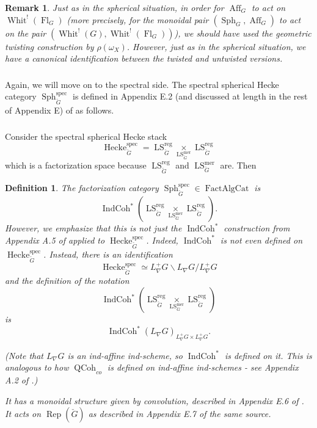 \documentclass[10pt,a4paper]{amsart}
\newtheorem{defn}[subsubsection]{Definition}
\newtheorem{rem}[subsubsection]{Remark}
\newcommand{\on}[1]{\operatorname{#1}}
\newcommand{\QCoh}{\on{QCoh}}
\newcommand{\IndCoh}{\on{IndCoh}}
\newcommand{\Gcheck}{\check{G}}
\newcommand{\FactAlgCat}{\on{FactAlgCat}}
\newcommand{\sssec}[1]{\subsubsection{}}
\begin{document}
\begin{rem}
Just as in the spherical situation, in order for $\on{Aff}_G$ to act on $\on{Whit}^!(\on{Fl}_G)$ (more precisely, for the monoidal pair $(\on{Sph}_G, \on{Aff}_G)$ to act on the pair $(\on{Whit}^!(G), \on{Whit}^!(\on{Fl}_G))$), we should have used the geometric twisting construction by $\rho(\omega_X)$. However, just as in the spherical situation, we have a canonical identification between the twisted and untwisted versions.
\end{rem}

\sssec{}
Again, we will move on to the spectral side. The spectral spherical Hecke category $\on{Sph}_{\Gcheck}^{\on{spec}}$ is defined in Appendix E.2 (and discussed at length in the rest of Appendix E) of \cite{GLC2} as follows.

\sssec{}
Consider the spectral spherical Hecke stack
$$
\on{Hecke}_{\Gcheck}^{\on{spec}} = \on{LS}_{\Gcheck}^{\on{reg}} \underset{\on{LS}_{\Gcheck}^{\on{mer}}}{\times} \on{LS}_{\Gcheck}^{\on{reg}}
$$
which is a factorization space because $\on{LS}_{\Gcheck}^{\on{reg}}$ and $\on{LS}_{\Gcheck}^{\on{mer}}$ are. Then

\begin{defn}
    The factorization category $\on{Sph}_{\Gcheck}^{\on{spec}} \in \FactAlgCat$ is
    $$
    \IndCoh^*(\on{LS}_{\Gcheck}^{\on{reg}} \underset{\on{LS}_{\Gcheck}^{\on{mer}}}{\times} \on{LS}_{\Gcheck}^{\on{reg}}).
    $$
    However, we emphasize that this is \emph{not} just the $\IndCoh^*$ construction from Appendix A.5 of \cite{GLC2} applied to $\on{Hecke}_{\Gcheck}^{\on{spec}}$. Indeed, $\IndCoh^*$ is not even defined on $\on{Hecke}_{\Gcheck}^{\on{spec}}$. Instead, there is an identification
    $$
    \on{Hecke}_{\Gcheck}^{\on{spec}} \simeq L_{\nabla}^+G \backslash L_{\nabla}G/L_{\nabla}^+G
    $$
    and the definition of the notation
    $$
    \IndCoh^*(\on{LS}_{\Gcheck}^{\on{reg}} \underset{\on{LS}_{\Gcheck}^{\on{mer}}}{\times} \on{LS}_{\Gcheck}^{\on{reg}})
    $$
    is 
    $$
    \IndCoh^*(L_{\nabla}G)_{L_{\nabla}^+G \times L_{\nabla}^+G}.
    $$
    
    (Note that $L_{\nabla}G$ is an ind-affine ind-scheme, so $\IndCoh^*$ is defined on it. This is analogous to how $\QCoh_{co}$ is defined on ind-affine ind-schemes - see Appendix A.2 of \cite{GLC2}.)
    
    It has a monoidal structure given by convolution, described in Appendix E.6 of \cite{GLC2}. It acts on $\on{Rep}(\Gcheck)$ as described in Appendix E.7 of the same source.
\end{defn}
\end{document}

